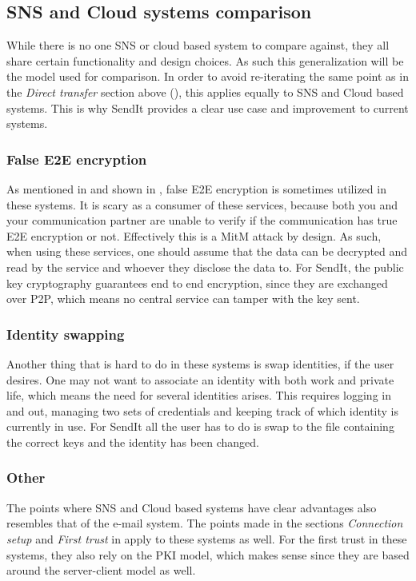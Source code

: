 \subsection{SNS and Cloud systems comparison}
  While there is no one SNS or cloud based system to compare against, they all share certain functionality and design choices. As such this generalization will be the model used for comparison. In order to avoid re-iterating the same point as in the \emph{Direct transfer} section above (), this applies equally to SNS and Cloud based systems. This is why SendIt provides a clear use case and improvement to current systems.
%
  \subsubsection*{False E2E encryption}
  As mentioned in  and shown in , false E2E encryption is sometimes utilized in these systems. It is scary as a consumer of these services, because both you and your communication partner are unable to verify if the communication has true E2E encryption or not. Effectively this is a MitM attack by design. As such, when using these services, one should assume that the data can be decrypted and read by the service and whoever they disclose the data to. For SendIt, the public key cryptography guarantees end to end encryption, since they are exchanged over P2P, which means no central service can tamper with the key sent. 
%
  \subsubsection*{Identity swapping}
  Another thing that is hard to do in these systems is swap identities, if the user desires. One may not want to associate an identity with both work and private life, which means the need for several identities arises. This requires logging in and out, managing two sets of credentials and keeping track of which identity is currently in use. For SendIt all the user has to do is swap to the file containing the correct keys and the identity has been changed.
%
  \subsubsection*{Other}
  The points where SNS and Cloud based systems have clear advantages also resembles that of the e-mail system. The points made in the sections \emph{Connection setup} and \emph{First trust} in  apply to these systems as well. For the first trust in these systems, they also rely on the PKI model, which makes sense since they are based around the server-client model as well.


